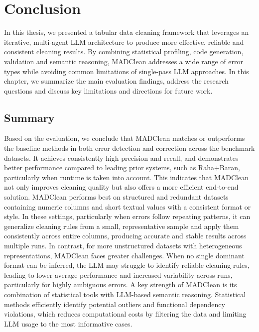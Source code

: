 \chapter{Conclusion}
In this thesis, we presented a tabular data cleaning framework that leverages an iterative, multi-agent LLM architecture to produce more effective, reliable and consistent cleaning results. 
By combining statistical profiling, code generation, validation and semantic reasoning, MADClean addresses a wide range of error types while avoiding common limitations of single-pass LLM approaches.
In this chapter, we summarize the main evaluation findings, address the research questions and discuss key limitations and directions for future work.

\section{Summary}
Based on the evaluation, we conclude that MADClean matches or outperforms the baseline methods in both error detection and correction across the benchmark datasets. 
It achieves consistently high precision and recall, and demonstrates better performance compared to leading prior systems, such as Raha+Baran, particularly when runtime is taken into account. 
This indicates that MADClean not only improves cleaning quality but also offers a more efficient end-to-end solution.
\newline\newline
MADClean performs best on structured and redundant datasets containing numeric columns and short textual values with a consistent format or style. 
In these settings, particularly when errors follow repeating patterns, it can generalize cleaning rules from a small, representative sample and apply them consistently across entire columns, producing accurate and stable results across multiple runs. 
In contrast, for more unstructured datasets with heterogeneous representations, MADClean faces greater challenges. 
When no single dominant format can be inferred, the LLM may struggle to identify reliable cleaning rules, leading to lower average performance and increased variability across runs, particularly for highly ambiguous errors.
\newline\newline
A key strength of MADClean is its combination of statistical tools with LLM-based semantic reasoning. 
Statistical methods efficiently identify potential outliers and functional dependency violations, which reduces computational costs by filtering the data and limiting LLM usage to the most informative cases. 
